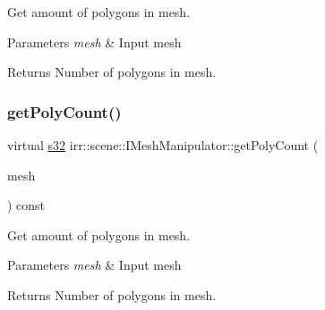 Get amount of polygons in mesh. 


\begin{DoxyParams}{Parameters}
{\em mesh} & Input mesh \\
\hline
\end{DoxyParams}
\begin{DoxyReturn}{Returns}
Number of polygons in mesh. 
\end{DoxyReturn}
\mbox{\label{classirr_1_1scene_1_1IMeshManipulator_a914c8cbfbde1428dea91b34fe99e716d}} 
\subsubsection{\texorpdfstring{get\+Poly\+Count()}{getPolyCount()}\hspace{0.1cm}{\footnotesize\ttfamily [2/4]}}
{\footnotesize\ttfamily virtual \hyperlink{namespaceirr_ac66849b7a6ed16e30ebede579f9b47c6}{s32} irr\+::scene\+::\+I\+Mesh\+Manipulator\+::get\+Poly\+Count (\begin{DoxyParamCaption}\item[{\hyperlink{classirr_1_1scene_1_1IMesh}{I\+Mesh} $\ast$}]{mesh }\end{DoxyParamCaption}) const\hspace{0.3cm}{\ttfamily [pure virtual]}}



Get amount of polygons in mesh. 


\begin{DoxyParams}{Parameters}
{\em mesh} & Input mesh \\
\hline
\end{DoxyParams}
\begin{DoxyReturn}{Returns}
Number of polygons in mesh. 
\end{DoxyReturn}
\mbox{\label{classirr_1_1scene_1_1IMeshManipulator_af20519dbaa2c2c346e8ddf7c94babc38}} 
